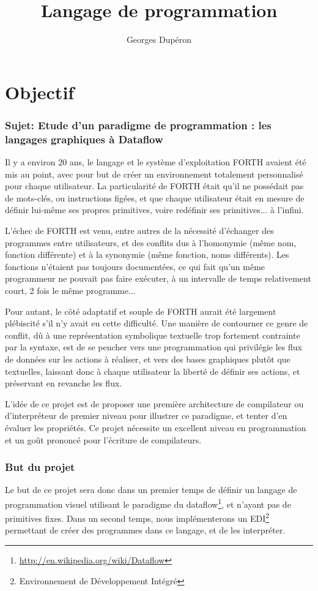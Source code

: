 \documentclass{article}
\author{Georges Dupéron}
\title{Langage de programmation}
\begin{document}
\maketitle
\tableofcontents
\newpage

\part{Objectif}

\section[Sujet]{Sujet: Etude d'un paradigme de programmation : les langages graphiques à Dataflow}
Il y a environ 20 ans, le langage et le système d'exploitation FORTH avaient été mis au point, avec pour but de créer un environnement
totalement personnalisé pour chaque utilisateur. La particularité de FORTH était qu'il ne possédait pas de mots-clés, ou instructions
figées, et que chaque utilisateur était en mesure de définir lui-même ses propres primitives, voire redéfinir ses primitives... à
l'infini.

L'échec de FORTH est venu, entre autres de la nécessité d'échanger des programmes entre utilisateurs, et des conflits dus à l'homonymie
(même nom, fonction différente) et à la synonymie (même fonction, noms différents). %
Les fonctions n'étaient pas toujours documentées, ce qui fait qu'un même programmeur ne pouvait pas faire exécuter, à un intervalle de
temps relativement court, 2 fois le même programme...

Pour autant, le côté adaptatif et souple de FORTH aurait été largement plébiscité s'il n'y avait eu cette difficulté. Une manière de
contourner ce genre de conflit, dû à une représentation symbolique textuelle trop fortement contrainte par la syntaxe, est de se pencher
vers une programmation qui privilégie les flux de données sur les actions à réaliser, et vers des bases graphiques plutôt que textuelles,
laissant donc à chaque utilisateur la liberté de définir ses actions, et préservant en revanche les flux.

L'idée de ce projet est de proposer une première architecture de compilateur ou d'interpréteur de premier niveau pour illustrer ce
paradigme, et tenter d'en évaluer les propriétés. Ce projet nécessite un excellent niveau en programmation et un goût prononcé pour
l'écriture de compilateurs.

\section{But du projet}
Le but de ce projet sera donc dans un premier temps de définir un langage de programmation visuel utilisant le paradigme du
dataflow\footnote{\url{http://en.wikipedia.org/wiki/Dataflow}}, et n'ayant pas de primitives fixes. Dans un second temps, nous
implémenterons un EDI\footnote{Environnement de Développement Intégré} permettant de créer des programmes dans ce langage, et de les
interpréter.
\end{document}
